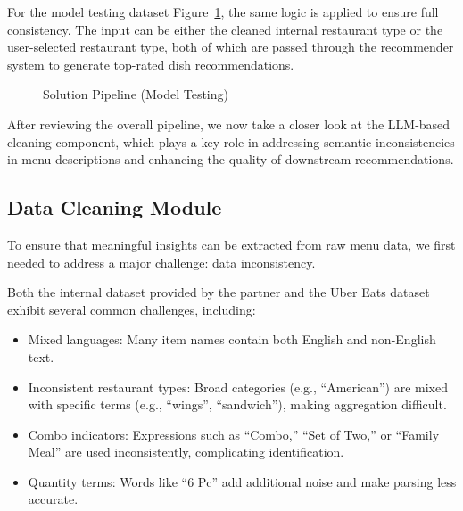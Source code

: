 \documentclass[
  11pt,
  a4paper,
  DIV=11,
  numbers=noendperiod]{scrartcl}
\providecommand{\tightlist}{%
  \setlength{\itemsep}{0pt}\setlength{\parskip}{0pt}}\usepackage{longtable,booktabs,array}
\begin{document}
For the model testing dataset Figure~\ref{fig-testing-pipline}, the same
logic is applied to ensure full consistency. The input can be either the
cleaned internal restaurant type or the user-selected restaurant type,
both of which are passed through the recommender system to generate
top-rated dish recommendations.

\begin{figure}

\caption{\label{fig-testing-pipline}Solution Pipeline (Model Testing)}


\end{figure}%

After reviewing the overall pipeline, we now take a closer look at the
LLM-based cleaning component, which plays a key role in addressing
semantic inconsistencies in menu descriptions and enhancing the quality
of downstream recommendations.

\subsection{Data Cleaning Module}\label{data-cleaning-module}

To ensure that meaningful insights can be extracted from raw menu data,
we first needed to address a major challenge: data inconsistency.

Both the internal dataset provided by the partner and the Uber Eats
dataset exhibit several common challenges, including:

\begin{itemize}
\tightlist
\item
  Mixed languages: Many item names contain both English and non-English
  text.
\item
  Inconsistent restaurant types: Broad categories (e.g., ``American'')
  are mixed with specific terms (e.g., ``wings'', ``sandwich''), making
  aggregation difficult.
\item
  Combo indicators: Expressions such as ``Combo,'' ``Set of Two,'' or
  ``Family Meal'' are used inconsistently, complicating identification.
\item
  Quantity terms: Words like ``6 Pc'' add additional noise and make
  parsing less accurate.
\end{itemize}
\end{document}
